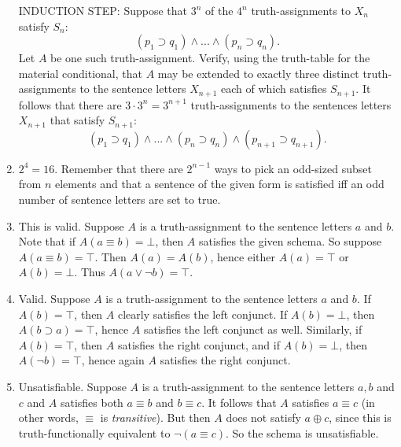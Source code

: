 \begin{mdframed}[linewidth=1]
\begin{enumerate}
    INDUCTION STEP: Suppose that $3^n$ of the  $4^n$ truth-assignments to $X_n$ satisfy $S_n$:
    \[ 
    (p_1 \supset q_1) \land ... \land (p_n \supset q_n). 
    \]
    Let $A$ be one such truth-assignment. Verify, using the truth-table for the material conditional, that $A$ may be extended to exactly  three distinct truth-assignments to the sentence letters $X_{n+1}$ each of which satisfies $S_{n+1}$. It follows that   there are $3\cdot3^n=3^{n + 1}$ truth-assignments to the sentences letters $X_{n+1}$ that satisfy $S_{n + 1}$: 
    \[ 
    (p_1 \supset q_1) \land ... \land (p_n \supset q_n) 
    \land (p_{n + 1} \supset q_{n + 1}). 
    \] 

    \item $2^4 = 16$. Remember that there are $2^{n-1}$ ways to pick an odd-sized subset from $n$ elements and that a sentence of the given form is satisfied iff an odd number of sentence letters are set to true. 

    \item This is valid. Suppose $A$ is a truth-assignment to the sentence letters $a$ and $b$. Note that if $A(a \equiv b)=\bot$, then $A$ satisfies the given schema. So suppose $A(a \equiv b)=\top$. Then $A(a)=A(b)$, hence either $A(a)=\top$ or $A(b)=\bot$. Thus $A(a \vee \lnot b)=\top$. %

    \item Valid. Suppose $A$ is a truth-assignment to the sentence letters $a$ and $b$. If $A(b)=\top$, then $A$ clearly satisfies the left conjunct. If $A(b)=\bot$, then $A(b \supset a)=\top$, hence $A$ satisfies the left conjunct  as well. Similarly, if $A(b)=\top$, then $A$ satisfies the right conjunct, and if $A(b)=\bot$, then $A(\lnot b)=\top$, hence again $A$ satisfies the right conjunct. 

    \item Unsatisfiable. Suppose $A$ is a truth-assignment to the sentence letters $a,b$ and $c$ and $A$ satisfies both $a\equiv b$  and $b\equiv c$. It follows that $A$ satisfies $a\equiv c$ (in other words, $\equiv$ is \emph{transitive}). But then $A$ does not satisfy $a \oplus c$, since this is truth-functionally equivalent to $\lnot (a\equiv c)$. So the schema is unsatisfiable. 


\end{enumerate}
\end{mdframed}
